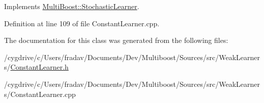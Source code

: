 Implements \hyperlink{classMultiBoost_1_1StochasticLearner_a0827c95202f6f3f5180292f72f2f3e0f}{MultiBoost::StochasticLearner}.



Definition at line 109 of file ConstantLearner.cpp.



The documentation for this class was generated from the following files:\begin{DoxyCompactItemize}
\item 
/cygdrive/c/Users/fradav/Documents/Dev/Multiboost/Sources/src/WeakLearners/\hyperlink{ConstantLearner_8h}{ConstantLearner.h}\item 
/cygdrive/c/Users/fradav/Documents/Dev/Multiboost/Sources/src/WeakLearners/ConstantLearner.cpp\end{DoxyCompactItemize}
